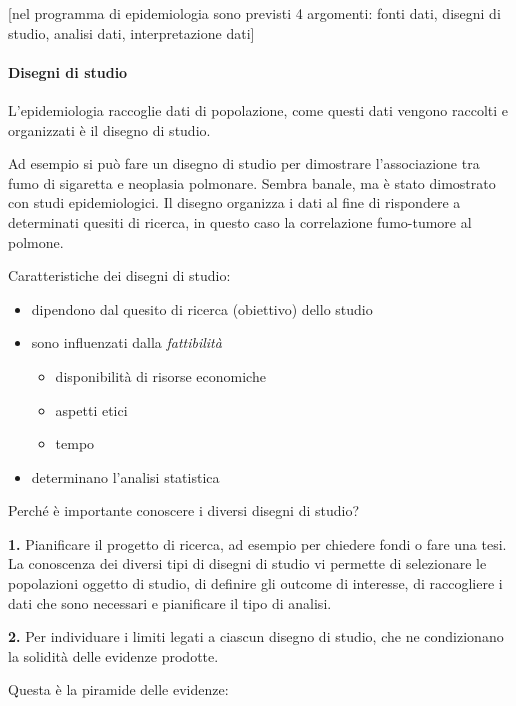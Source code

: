 {[}nel programma di epidemiologia sono previsti 4 argomenti: fonti dati,
disegni di studio, analisi dati, interpretazione dati{]}

\paragraph{Disegni di studio}


L'epidemiologia raccoglie dati di popolazione, come questi dati vengono
raccolti e organizzati è il disegno di studio.

Ad esempio si può fare un disegno di studio per dimostrare
l'associazione tra fumo di sigaretta e neoplasia polmonare. Sembra
banale, ma è stato dimostrato con studi epidemiologici. Il disegno
organizza i dati al fine di rispondere a determinati quesiti di ricerca,
in questo caso la correlazione fumo-tumore al polmone.

Caratteristiche dei disegni di studio:

\begin{itemize}
\item
  dipendono dal quesito di ricerca (obiettivo) dello studio
\item
  sono influenzati dalla \emph{fattibilità}

  \begin{itemize}
  \item
    disponibilità di risorse economiche
  \item
    aspetti etici
  \item
    tempo
  \end{itemize}
\item
  determinano l'analisi statistica
\end{itemize}

Perché è importante conoscere i diversi disegni di studio?

\textbf{1.} Pianificare il progetto di ricerca, ad esempio per chiedere
fondi o fare una tesi. La conoscenza dei diversi tipi di disegni di
studio vi permette di selezionare le popolazioni oggetto di studio, di
definire gli outcome di interesse, di raccogliere i dati che sono
necessari e pianificare il tipo di analisi.

\textbf{2.} Per individuare i limiti legati a ciascun disegno di studio,
che ne condizionano la solidità delle evidenze prodotte.

Questa è la piramide delle evidenze:

